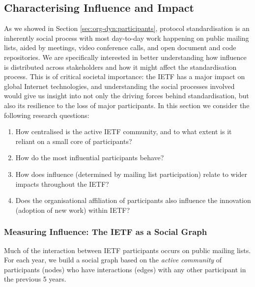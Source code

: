 \documentclass[twocolumn,10pt]{article}
\begin{document}
\subsection{Characterising Influence and Impact}
\label{sec:org-dyn:influence}



As we showed in Section \ref{sec:org-dyn:participants}, protocol
standardisation is an inherently social process with most day-to-day work
happening on public mailing lists, aided by meetings, video conference
calls, and open document and code repositories.  We are specifically
interested in better understanding how influence is distributed across
stakeholders and how it might affect the standardisation process.  This is
of critical societal importance: the IETF has a major impact on global
Internet technologies, and understanding the social processes involved
would give us insight into not only the driving forces behind
standardisation, but also its resilience to the loss of major participants.
In this section we consider the following research questions: 
\begin{enumerate}
  \item How centralised is the active IETF community, and to what extent
    is it reliant on a small core of participants? 
  \item How do the most influential participants behave? 
  \item How does influence (determined by mailing list participation)
    relate to wider impacts throughout the IETF?
  \item Does the organisational affiliation of participants also
    influence the innovation (adoption of new work) within IETF?
\end{enumerate}

\subsubsection{Measuring Influence: The IETF as a Social Graph}

\label{subsec:measuring_influence}

Much of the interaction between IETF participants occurs on public mailing
lists.  For each year, we build a social graph based on the \emph{active
community} of participants (nodes) who have interactions (edges) with any
other participant in the previous 5 years. 
\end{document}

